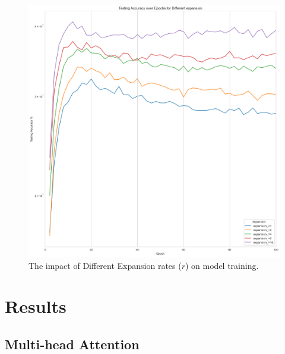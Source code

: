\documentclass[10pt,twocolumn,letterpaper]{article}
\begin{document}
\begin{figure}[htbp]
\begin{minipage}[t]{0.33\textwidth}
   \end{minipage}
   \begin{minipage}[t]{0.33\textwidth}
      \centering
      \includegraphics[width=\textwidth]{Fig/8.png}
   \end{minipage}
   \caption{The impact of Different Expansion rates (\(r\)) on model training.}
\end{figure}

\section{Results} \label{sec:results}

\subsection{Multi-head Attention}
\end{document}
